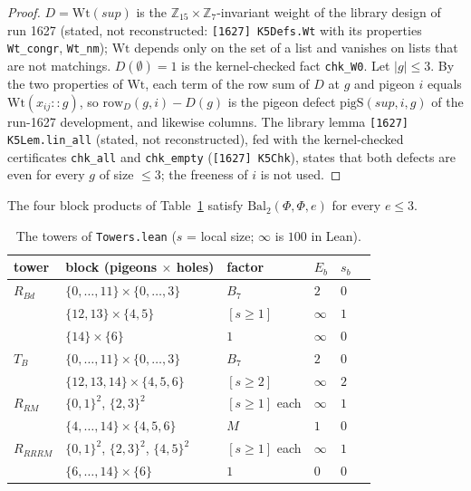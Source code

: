 \begin{proof}
$D=\mathrm{Wt}(\mathit{sup})$ is the $\mathbb Z_{15}\times\mathbb Z_7$-invariant weight of the
library design of run 1627 (stated, not reconstructed: \texttt{[1627] K5Defs.Wt}
with its properties \texttt{Wt\_congr}, \texttt{Wt\_nm}); $\mathrm{Wt}$ depends only on the set of a list and vanishes on lists
that are not matchings.  $D(\emptyset)=1$ is the kernel-checked fact
\texttt{chk\_W0}.  Let $|g|\le3$.  By the two properties of $\mathrm{Wt}$, each term of the row
sum of $D$ at $g$ and pigeon $i$ equals $\mathrm{Wt}(x_{ij}::g)$, so
$\mathrm{row}_D(g,i)-D(g)$ is the pigeon defect $\mathrm{pigS}(\mathit{sup},i,g)$ of the run-1627
development, and likewise columns.  The library
lemma \texttt{[1627] K5Lem.lin\_all} (stated, not reconstructed), fed with the
kernel-checked certificates \texttt{chk\_all} and \texttt{chk\_empty} (\texttt{[1627] K5Chk}),
states that both defects are even for every $g$ of size $\le3$; the freeness of $i$ is not
used.
\end{proof}

\begin{lemma}[towers]\label{lem:C-towers}
The four block products of Table~\ref{tab:towers} satisfy $\mathrm{Bal}_2(\Phi,\Phi,e)$ for
every $e\le3$.
\end{lemma}

\begin{table}[ht]
\centering\small
\begin{tabular}{llllll}
tower & block (pigeons $\times$ holes) & factor & $E_b$ & $s_b$\\\hline
$R_{Bd}$ & $\{0,\dots,11\}\times\{0,\dots,3\}$ & $B_7$ & $2$ & $0$\\
 & $\{12,13\}\times\{4,5\}$ & $[s\ge1]$ & $\infty$ & $1$\\
 & $\{14\}\times\{6\}$ & $1$ & $\infty$ & $0$\\\hline
$T_B$ & $\{0,\dots,11\}\times\{0,\dots,3\}$ & $B_7$ & $2$ & $0$\\
 & $\{12,13,14\}\times\{4,5,6\}$ & $[s\ge2]$ & $\infty$ & $2$\\\hline
$R_{RM}$ & $\{0,1\}^2$, $\{2,3\}^2$ & $[s\ge1]$ each & $\infty$ & $1$\\
 & $\{4,\dots,14\}\times\{4,5,6\}$ & $M$ & $1$ & $0$\\\hline
$R_{RRRM}$ & $\{0,1\}^2$, $\{2,3\}^2$, $\{4,5\}^2$ & $[s\ge1]$ each & $\infty$ & $1$\\
 & $\{6,\dots,14\}\times\{6\}$ & $1$ & $0$ & $0$
\end{tabular}
\caption{The towers of \texttt{Towers.lean} ($s$ = local size; $\infty$ is $100$ in Lean).}
\label{tab:towers}
\end{table}

